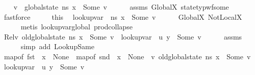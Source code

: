 \begin{isabellebody}
\ \ \isamarkupfalse%
\ v\ \ {\isachardoublequoteopen}global{\isacharunderscore}{\kern0pt}state\ ns\ x\ {\isacharequal}{\kern0pt}\ Some\ v{\isachardoublequoteclose}\isanewline
\ \ \ \ \isamarkupfalse%
\ assms{\isacharparenleft}{\kern0pt}{}{\isacharparenright}{\kern0pt}\ GlobalX\ state{\isacharunderscore}{\kern0pt}typ{\isacharunderscore}{\kern0pt}wf{\isacharunderscore}{\kern0pt}some\isanewline
\ \ \ \ \isamarkupfalse%
\ fastforce\isanewline
\ \ \isamarkupfalse%
\ \isamarkupfalse%
\ this\ \isamarkupfalse%
\ {\isachardoublequoteopen}lookup{\isacharunderscore}{\kern0pt}var\ {\isasymLambda}{}\ ns\ x\ {\isacharequal}{\kern0pt}\ Some\ v{\isachardoublequoteclose}\isanewline
\ \ \ \ \isamarkupfalse%
\ GlobalX\ NotLocalX\isanewline
\ \ \ \ \isamarkupfalse%
\ {\isacharparenleft}{\kern0pt}metis\ lookup{\isacharunderscore}{\kern0pt}var{\isacharunderscore}{\kern0pt}global\ prod{\isachardot}{\kern0pt}collapse{\isacharparenright}{\kern0pt}\isanewline
\ \ \isamarkupfalse%
\ \isamarkupfalse%
\ Rel{\isacharcolon}{\kern0pt}{\isachardoublequoteopen}{\isacharparenleft}{\kern0pt}{\isasymexists}v{\isachardot}{\kern0pt}\ old{\isacharunderscore}{\kern0pt}global{\isacharunderscore}{\kern0pt}state\ ns\ x\ {\isacharequal}{\kern0pt}\ Some\ v\ {\isasymand}\ lookup{\isacharunderscore}{\kern0pt}var\ {\isasymLambda}{}\ u\ y\ {\isacharequal}{\kern0pt}\ Some\ v{\isacharparenright}{\kern0pt}{\isachardoublequoteclose}\isanewline
\ \ \ \ \isamarkupfalse%
\ assms{\isacharparenleft}{\kern0pt}{}{\isacharparenright}{\kern0pt}\ \ \ \ \isanewline
\ \ \ \ \isamarkupfalse%
\ {\isacharparenleft}{\kern0pt}simp\ add{\isacharcolon}{\kern0pt}\ LookupSame{\isacharparenright}{\kern0pt}\isanewline
\ \ \isanewline
\ \ \isamarkupfalse%
\ {\isachardoublequoteopen}{\isacharparenleft}{\kern0pt}map{\isacharunderscore}{\kern0pt}of\ {\isacharparenleft}{\kern0pt}fst\ {\isasymLambda}{}{\isacharparenright}{\kern0pt}\ x\ {\isasymnoteq}\ None\ {\isasymand}\ map{\isacharunderscore}{\kern0pt}of\ {\isacharparenleft}{\kern0pt}snd\ {\isasymLambda}{}{\isacharparenright}{\kern0pt}\ x\ {\isacharequal}{\kern0pt}\ None{\isacharparenright}{\kern0pt}\ {\isasymand}\ {\isacharparenleft}{\kern0pt}{\isasymexists}v{\isachardot}{\kern0pt}\ old{\isacharunderscore}{\kern0pt}global{\isacharunderscore}{\kern0pt}state\ ns\ x\ {\isacharequal}{\kern0pt}\ Some\ v\ {\isasymand}\ lookup{\isacharunderscore}{\kern0pt}var\ {\isasymLambda}{}\ u\ y\ {\isacharequal}{\kern0pt}\ Some\ v{\isacharparenright}{\kern0pt}{\isachardoublequoteclose}\isanewline

\end{isabellebody}
